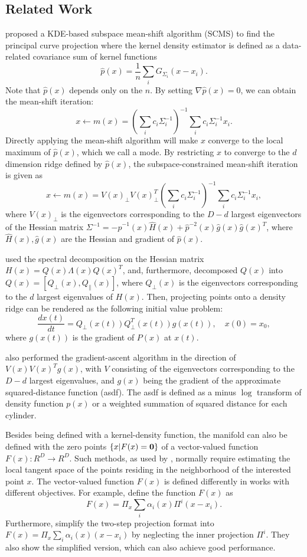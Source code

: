 \documentclass[aos,preprint]{imsart}
\theoremstyle{remark}
\begin{document}
\subsection{Related Work}
\cite{ozertem2011locally} proposed a KDE-based subspace mean-shift algorithm (SCMS) to find the principal curve projection where the kernel density estimator is defined as a data-related covariance sum of kernel functions 
\[
\hat{p}(x) = \frac{1}{n}\sum_i G_{\Sigma_i}(x -x_i).
\] 
{Note that $\hat{p}(x)$ depends only on the $n$.} By setting $\nabla \hat{p}(x) = 0$, we can obtain the mean-shift iteration: 
\[
x\leftarrow m(x) = (\sum_i c_i \Sigma_i^{-1} )^{-1} \sum_i c_i \Sigma_i^{-1}x_i.
\]
Directly applying the mean-shift algorithm will make $x$ converge to the local maximum of $\hat{p}(x)$, which we call a mode. By restricting $x$ to converge to the $d$ dimension ridge defined by $\hat{p}(x)$, the subspace-constrained mean-shift iteration \cite{ozertem2011locally} is given as
\[
x\leftarrow m(x) =V(x)_{\perp} V(x)_{\perp}^T (\sum_i c_i \Sigma_i^{-1} )^{-1} \sum_i c_i \Sigma_i^{-1}x_i,
\]
where $V(x)_{\perp}$ is the eigenvectors corresponding to the $D-d$ largest eigenvectors of the Hessian matrix $\Sigma^{-1} = -\hat{p}^{-1}(x)\hat{H}(x)+\hat{p}^{-2}(x)\hat{g}(x)\hat{g}(x)^T$, where $\hat{H}(x), \hat{g}(x)$ are the Hessian and gradient of $\hat{p}(x)$.

\cite{myhre2016manifold} used the spectral decomposition on the Hessian matrix $H(x) = Q(x)\Lambda(x)Q(x)^T$, and, furthermore, decomposed $Q(x)$ into $Q(x)=[Q_\perp(x), Q_{\|}(x)]$, where $Q_\perp(x)$ is the eigenvectors corresponding to the $d$ largest eigenvalues of $H(x)$. Then, projecting points onto a density ridge can be rendered as the following initial value problem:
\[
\frac{d x(t)}{dt} = Q_{\perp}(x(t)) Q^T_{\perp}(x(t)) g(x(t)), \quad x(0) = x_0,
\]
where $g(x(t))$ is the gradient of $P(x)$ at $x(t)$.

\cite{mohammed2017manifold} also performed the gradient-ascent algorithm in the direction of $V(x)V(x)^Tg(x)$, with $V$ consisting of the eigenvectors corresponding to the $D-d$ largest eigenvalues, and $g(x)$ being the gradient of the approximate squared-distance function (asdf). The asdf is defined as a minus $\log$ transform of density function $p(x)$ or a weighted summation of squared distance for each cylinder.

Besides being defined with a kernel-density function, the manifold can also be defined with the zero points $\{x| F(x)={\bf 0}\}$ of a vector-valued function $F(x): R^D \rightarrow R^D$. Such methods, as used by \cite{fefferman2018fitting, mohammed2017manifold, yao2019manifold}, normally require estimating the local tangent space of the points residing in the neighborhood of the interested point $x$. The vector-valued function $F(x)$ is defined differently in works with different objectives. For example,  \cite{fefferman2018fitting} define the function $F(x)$ as
\[
F(x)= \Pi_x \sum_i \alpha_i(x) \Pi^i(x - x_i).
\]
Furthermore, \cite{yao2019manifold} simplify the two-step projection format into $F(x)= \Pi_x \sum_i \alpha_i(x) (x - x_i)$ by neglecting the inner projection $\Pi^i$. They also show the simplified version, which can also achieve good performance.
\end{document}
